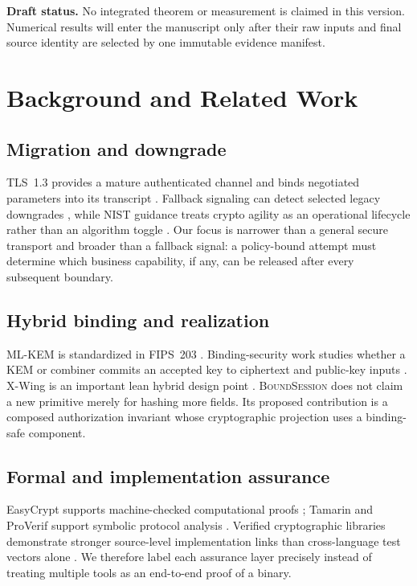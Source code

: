 \documentclass[journal]{IEEEtran}
\newcommand{\system}{\textsc{BoundSession}}
\begin{document}
\noindent\textbf{Draft status.} No integrated theorem or measurement is claimed
in this version. Numerical results will enter the manuscript only after their
raw inputs and final source identity are selected by one immutable evidence
manifest.

\section{Background and Related Work}

\subsection{Migration and downgrade}
TLS~1.3 provides a mature authenticated channel and binds negotiated parameters
into its transcript \cite{rfc8446}. Fallback signaling can detect selected legacy
downgrades \cite{rfc7507}, while NIST guidance treats crypto agility as an
operational lifecycle rather than an algorithm toggle \cite{nistagility}. Our
focus is narrower than a general secure transport and broader than a fallback
signal: a policy-bound attempt must determine which business capability, if any,
can be released after every subsequent boundary.

\subsection{Hybrid binding and realization}
ML-KEM is standardized in FIPS~203 \cite{fips203}. Binding-security work studies
whether a KEM or combiner commits an accepted key to ciphertext and public-key
inputs \cite{cdm2024,schmieg2024,chempat2025}. X-Wing is an important lean hybrid
design point \cite{xwing}. \system{} does not claim a new primitive merely for
hashing more fields. Its proposed contribution is a composed authorization
invariant whose cryptographic projection uses a binding-safe component.

\subsection{Formal and implementation assurance}
EasyCrypt supports machine-checked computational proofs \cite{easycrypt};
Tamarin and ProVerif support symbolic protocol analysis
\cite{tamarin,proverif}. Verified cryptographic libraries demonstrate stronger
source-level implementation links than cross-language test vectors alone
\cite{hacl,formosa}. We therefore label each assurance layer precisely instead
of treating multiple tools as an end-to-end proof of a binary.
\end{document}
